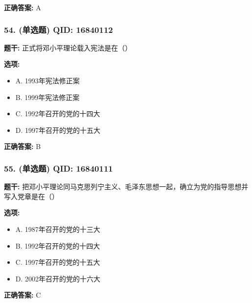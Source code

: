 \documentclass[12pt,UTF8]{ctexart}
\begin{document}
\textbf{正确答案:}
A

\vspace{0.3em}\hrulefill\vspace{0.7em}

\subsubsection*{54. (单选题) \small QID: 16840112}

\textbf{题干:}
正式将邓小平理论载入宪法是在（）

\textbf{选项:}
\begin{itemize}[leftmargin=*]

  \item A. 1993年宪法修正案

  \item B. 1999年宪法修正案

  \item C. 1992年召开的党的十四大

  \item D. 1997年召开的党的十五大

\end{itemize}

\textbf{正确答案:}
B

\vspace{0.3em}\hrulefill\vspace{0.7em}

\subsubsection*{55. (单选题) \small QID: 16840111}

\textbf{题干:}
把邓小平理论同马克思列宁主义、毛泽东思想一起，确立为党的指导思想并写入党章是在（）

\textbf{选项:}
\begin{itemize}[leftmargin=*]

  \item A. 1987年召开的党的十三大

  \item B. 1992年召开的党的十四大

  \item C. 1997年召开的党的十五大

  \item D. 2002年召开的党的十六大

\end{itemize}

\textbf{正确答案:}
C

\vspace{0.3em}\hrulefill\vspace{0.7em}
\end{document}
